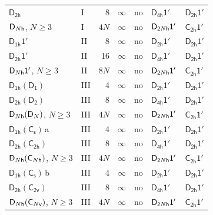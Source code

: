 \documentclass[10pt,a4paper]{article}
\numberwithin{equation}{section}
\newcommand{\grp}[1]{\mathsf{#1}}
\newcommand{\clsletter}[1]{\,{\scriptsize\color{black!55}#1}}
\begin{document}
{\begin{longtable}{@{}llrrlll@{}}
\href{../../../rotation/data/pdf/D2h.pdf}{$\grp{D_{2h}}$} & I & 8 & $\infty$ & no & \href{D4h-1p.pdf}{$\grp{D_{4h}1'}$} & \href{D2h-1p.pdf}{$\grp{D_{2h}1'}$}\\
$\grp{D_{\mathnormal{N}h}}$, $N \ge 3$ & I & $4N$ & $\infty$ & no & $\grp{D_{2\mathnormal{N}h}1'}$ & \href{C2h-1p.pdf}{$\grp{C_{2h}1'}$}\\
\href{D1h-1p.pdf}{$\grp{D_{1h}1'}$} & II & 8 & $\infty$ & no & \href{D2h-1p.pdf}{$\grp{D_{2h}1'}$} & \href{D2h-1p.pdf}{$\grp{D_{2h}1'}$}\\
\href{D2h-1p.pdf}{$\grp{D_{2h}1'}$} & II & 16 & $\infty$ & no & \href{D4h-1p.pdf}{$\grp{D_{4h}1'}$} & \href{D2h-1p.pdf}{$\grp{D_{2h}1'}$}\\
$\grp{D_{\mathnormal{N}h}1'}$, $N \ge 3$ & II & $8N$ & $\infty$ & no & $\grp{D_{2\mathnormal{N}h}1'}$ & \href{C2h-1p.pdf}{$\grp{C_{2h}1'}$}\\
\href{D1h-C2.pdf}{$\grp{D_{1h}}(\grp{D_{1}})$} & III & 4 & $\infty$ & no & \href{D2h-1p.pdf}{$\grp{D_{2h}1'}$} & \href{D2h-1p.pdf}{$\grp{D_{2h}1'}$}\\
\href{D2h-D2.pdf}{$\grp{D_{2h}}(\grp{D_{2}})$} & III & 8 & $\infty$ & no & \href{D4h-1p.pdf}{$\grp{D_{4h}1'}$} & \href{D2h-1p.pdf}{$\grp{D_{2h}1'}$}\\
$\grp{D_{\mathnormal{N}h}}(\grp{D_{\mathnormal{N}}})$, $N \ge 3$ & III & $4N$ & $\infty$ & no & $\grp{D_{2\mathnormal{N}h}1'}$ & \href{C2h-1p.pdf}{$\grp{C_{2h}1'}$}\\
\href{D1h-C1v.pdf}{$\grp{D_{1h}}(\grp{C_{s}})$}\clsletter{a} & III & 4 & $\infty$ & no & \href{D2h-1p.pdf}{$\grp{D_{2h}1'}$} & \href{D2h-1p.pdf}{$\grp{D_{2h}1'}$}\\
\href{D2h-C2h.pdf}{$\grp{D_{2h}}(\grp{C_{2h}})$} & III & 8 & $\infty$ & no & \href{D4h-1p.pdf}{$\grp{D_{4h}1'}$} & \href{D2h-1p.pdf}{$\grp{D_{2h}1'}$}\\
$\grp{D_{\mathnormal{N}h}}(\grp{C_{\mathnormal{N}h}})$, $N \ge 3$ & III & $4N$ & $\infty$ & no & $\grp{D_{2\mathnormal{N}h}1'}$ & \href{C2h-1p.pdf}{$\grp{C_{2h}1'}$}\\
\href{D1h-C1v.pdf}{$\grp{D_{1h}}(\grp{C_{s}})$}\clsletter{b} & III & 4 & $\infty$ & no & \href{D2h-1p.pdf}{$\grp{D_{2h}1'}$} & \href{D2h-1p.pdf}{$\grp{D_{2h}1'}$}\\
\href{D2h-C2v.pdf}{$\grp{D_{2h}}(\grp{C_{2v}})$} & III & 8 & $\infty$ & no & \href{D4h-1p.pdf}{$\grp{D_{4h}1'}$} & \href{D2h-1p.pdf}{$\grp{D_{2h}1'}$}\\
$\grp{D_{\mathnormal{N}h}}(\grp{C_{\mathnormal{N}v}})$, $N \ge 3$ & III & $4N$ & $\infty$ & no & $\grp{D_{2\mathnormal{N}h}1'}$ & \href{C2h-1p.pdf}{$\grp{C_{2h}1'}$}\\

\end{longtable}}
\end{document}
